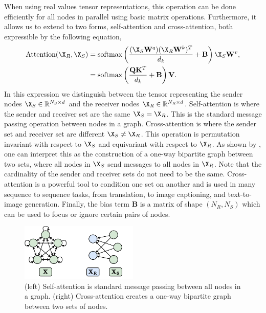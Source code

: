 When using real values tensor representations, this operation can be done efficiently for all nodes in parallel using basic matrix operations.
Furthermore, it allows us to extend to two forms, self-attention and cross-attention, both expressible by the following equation,
\begin{equation}
    \label{eq:attention}
    \begin{aligned}
        \text{Attention}(\X_R, \X_S)
        &= \text{softmax}\left(\frac{(\X_S \mathbf{W}^q) (\X_R \mathbf{W}^k)^T}{d_k} + \mathbf{B}\right) \X_S \mathbf{W}^v, \\
        &= \text{softmax}\left(\frac{\mathbf{Q} \mathbf{K}^T}{d_k} + \mathbf{B}\right) \mathbf{V}.
    \end{aligned}
    \end{equation}
In this expression we distinguish between the tensor representing the sender nodes $\X_S \in \mathbb{R}^{N_S \times d}$ and the receiver nodes $\X_R \in \mathbb{R}^{N_R \times d}$.
Self-attention is where the sender and receiver set are the same $\X_S = \X_R$.
This is the standard message passing operation between nodes in a graph.
Cross-attention is where the sender set and receiver set are different $\X_S \neq \X_R$.
This operation is permutation invariant with respect to $\X_S$ and equivariant with respect to $\X_R$.
As shown by , one can interpret this as the construction of a one-way bipartite graph between two sets, where all nodes in $\X_S$ send messages to all nodes in $\X_R$.
Note that the cardinality of the sender and receiver sets do not need to be the same.
Cross-attention is a powerful tool to condition one set on another and is used in many sequence to sequence tasks, from translation, to image captioning, and text-to-image generation.
Finally, the bias term $\mathbf{B}$ is a matrix of shape $(N_R, N_S)$ which can be used to focus or ignore certain pairs of nodes.

\begin{figure}
    \centering
    \includegraphics[width=0.5\textwidth]{Figures/graph_networks/bipartite.pdf}
    \caption{(left) Self-attention is standard message passing between all nodes in a graph. (right) Cross-attention creates a one-way bipartite graph between two sets of nodes.}
    \label{fig:bipartite}
\end{figure}

